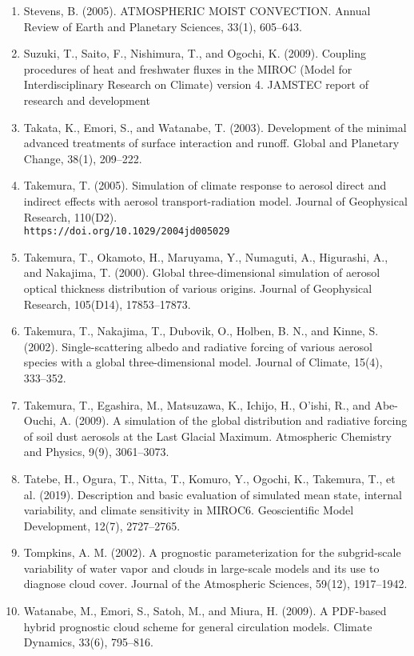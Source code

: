 \begin{enumerate}
\item Stevens, B. (2005). ATMOSPHERIC MOIST CONVECTION. Annual Review of Earth and Planetary Sciences, 33(1), 605–643.
\item Suzuki, T., Saito, F., Nishimura, T., and Ogochi, K. (2009). Coupling procedures of heat and freshwater fluxes in the MIROC (Model for Interdisciplinary Research on Climate) version 4. JAMSTEC report of research and development
\item Takata, K., Emori, S., and Watanabe, T. (2003). Development of the minimal advanced treatments of surface interaction and runoff. Global and Planetary Change, 38(1), 209–222.
\item Takemura, T. (2005). Simulation of climate response to aerosol direct and indirect effects with aerosol transport-radiation model. Journal of Geophysical Research, 110(D2). \\
\texttt{https://doi.org/10.1029/2004jd005029}
\item Takemura, T., Okamoto, H., Maruyama, Y., Numaguti, A., Higurashi, A., and Nakajima, T. (2000). Global three-dimensional simulation of aerosol optical thickness distribution of various origins. Journal of Geophysical Research, 105(D14), 17853–17873.
\item Takemura, T., Nakajima, T., Dubovik, O., Holben, B. N., and Kinne, S. (2002). Single-scattering albedo and radiative forcing of various aerosol species with a global three-dimensional model. Journal of Climate, 15(4), 333–352.
\item Takemura, T., Egashira, M., Matsuzawa, K., Ichijo, H., O’ishi, R., and Abe-Ouchi, A. (2009). A simulation of the global distribution and radiative forcing of soil dust aerosols at the Last Glacial Maximum. Atmospheric Chemistry and Physics, 9(9), 3061–3073.
\item Tatebe, H., Ogura, T., Nitta, T., Komuro, Y., Ogochi, K., Takemura, T., et al. (2019). Description and basic evaluation of simulated mean state, internal variability, and climate sensitivity in MIROC6. Geoscientific Model Development, 12(7), 2727–2765.
\item Tompkins, A. M. (2002). A prognostic parameterization for the subgrid-scale variability of water vapor and clouds in large-scale models and its use to diagnose cloud cover. Journal of the Atmospheric Sciences, 59(12), 1917–1942.
\item Watanabe, M., Emori, S., Satoh, M., and Miura, H. (2009). A PDF-based hybrid prognostic cloud scheme for general circulation models. Climate Dynamics, 33(6), 795–816.

\end{enumerate}

